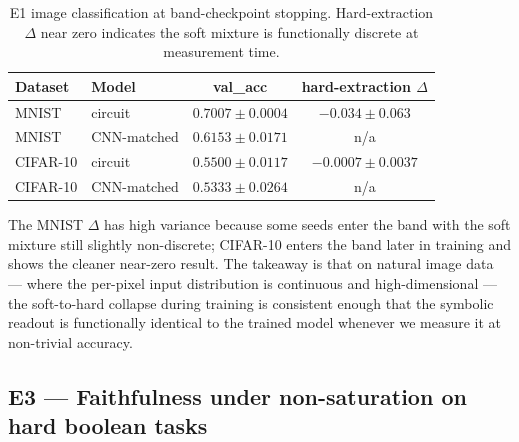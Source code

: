 \documentclass{article}
\begin{document}
\begin{table}[H]
\centering
\caption{E1 image classification at band-checkpoint stopping. Hard-extraction $\Delta$ near zero indicates the soft mixture is functionally discrete at measurement time.}
\label{tab:e1}
\begin{tabular}{llcc}
\toprule
\textbf{Dataset} & \textbf{Model} & \textbf{val\_acc} & \textbf{hard-extraction $\Delta$} \\
\midrule
MNIST    & circuit       & $0.7007 \pm 0.0004$ & $-0.034 \pm 0.063$ \\
MNIST    & CNN-matched   & $0.6153 \pm 0.0171$ & n/a \\
CIFAR-10 & circuit       & $0.5500 \pm 0.0117$ & $\mathbf{-0.0007 \pm 0.0037}$ \\
CIFAR-10 & CNN-matched   & $0.5333 \pm 0.0264$ & n/a \\
\bottomrule
\end{tabular}
\end{table}

The MNIST $\Delta$ has high variance because some seeds enter the band with the soft mixture still slightly non-discrete; CIFAR-10 enters the band later in training and shows the cleaner near-zero result.
The takeaway is that on natural image data --- where the per-pixel input distribution is continuous and high-dimensional --- the soft-to-hard collapse during training is consistent enough that the symbolic readout is functionally identical to the trained model whenever we measure it at non-trivial accuracy.

\subsection{E3 --- Faithfulness under non-saturation on hard boolean tasks}
\label{sec:e3}
\end{document}
